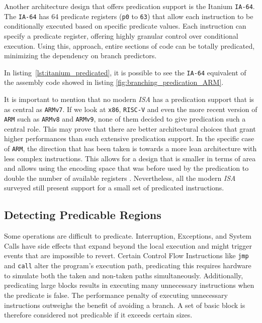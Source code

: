 Another architecture design that offers predication support is the Itanium \texttt{IA-64}.
The \texttt{IA-64} has 64 predicate registers (\texttt{p0} to \texttt{63}) that allow each instruction to be conditionally executed based on specific predicate values. Each instruction can specify a predicate register, offering highly granular control over conditional execution. Using this, approach, entire sections of code can be totally predicated, minimizing the dependency on branch predictors.

\begin{center}
\begin{minipage}{0.5\textwidth}

\end{minipage}
\end{center}

In listing~\ref{lst:itanium_predicated}, it is possible to see the \texttt{IA-64} equivalent of the assembly code showed in listing \ref{fig:branching_predication_ARM}.

It is important to mention that no modern \textit{ISA} has a predication support that is as central as \texttt{ARMv7}. If we look at \texttt{x86}, \texttt{RISC-V} and even the more recent version of \texttt{ARM} such as \texttt{ARMv8} and \texttt{ARMv9}, none of them decided to give predication such a central role.
This may prove that there are better architectural choices that grant higher performances than such extensive predication support.
In the specific case of \texttt{ARM}, the direction that has been taken is towards a more lean architecture with less complex instructions. This allows for a design that is smaller in terms of area and allows using the encoding space that was before used by the predication to double the number of available registers \cite{armv8_instruction_removal}. 
Nevertheless, all the modern \textit{ISA} surveyed still present support for a small set of predicated instructions.

\subsection{Detecting Predicable Regions}
\label{sec:detecting_pred}

Some operations are difficult to predicate. Interruption, Exceptions, and System Calls have side effects that expand beyond the local execution and might trigger events that are impossible to revert. Certain Control Flow Instructions like \texttt{jmp} and \texttt{call} alter the program's execution path, predicating this requires hardware to simulate both the taken and non-taken paths simultaneously.
Additionally, predicating large blocks results in executing many unnecessary instructions when the predicate is false. The performance penalty of executing unnecessary instructions outweighs the benefit of avoiding a branch. A set of basic block is therefore considered not predicable if it exceeds certain sizes.

